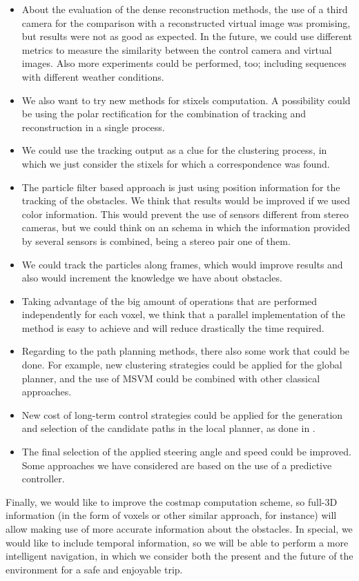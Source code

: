 \begin{itemize}
 \item About the evaluation of the dense reconstruction methods, the use of a third camera for the comparison with a reconstructed virtual image was promising, but results were not as good as expected. In the future, we could use different metrics to measure the similarity between the control camera and virtual images. Also more experiments could be performed, too; including sequences with different weather conditions.
 \item We also want to try new methods for stixels computation. A possibility could be using the polar rectification for the combination of tracking and reconstruction in a single process. 
 \item We could use the tracking output as a clue for the clustering process, in which we just consider the stixels for which a correspondence was found.
 \item The particle filter based approach is just using position information for the tracking of the obstacles. We think that results would be improved if we used color information. This would prevent the use of sensors different from stereo cameras, but we could think on an schema in which the information provided by several sensors is combined, being a stereo pair one of them.
 \item We could track the particles along frames, which would improve results and also would increment the knowledge we have about obstacles.
 \item Taking advantage of the big amount of operations that are performed independently for each voxel, we think that a parallel implementation of the method is easy to achieve and will reduce drastically the time required.
 \item Regarding to the path planning methods, there also some work that could be done. For example, new clustering strategies could be applied for the global planner, and the use of \ac{MSVM} could be combined with other classical approaches.
 \item New cost of long-term control strategies could be applied for the generation and selection of the candidate paths in the local planner, as done in \cite{werling2010optimal}.
 \item The final selection of the applied steering angle and speed could be improved. Some approaches we have considered are based on the use of a predictive controller.
\end{itemize}

Finally, we would like to improve the costmap computation scheme, so full-3D information (in the form of voxels or other similar approach, for instance) will allow making use of more accurate information about the obstacles. In special, we would like to include temporal information, so we will be able to perform a more intelligent navigation, in which we consider both the present and the future of the environment for a safe and enjoyable trip.